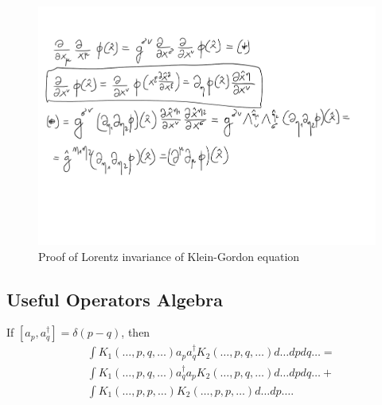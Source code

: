 \documentclass[main.tex]{subfiles}
\begin{document}
\begin{figure}
\label{klein-proof}
\includegraphics[scale=0.5]{figs/KleinInvariance}
\caption{Proof of Lorentz invariance of Klein-Gordon equation}
\end{figure}
\subsection{Useful Operators Algebra}
\begin{lemma}
If $[a_p, a^\dagger_q] = \delta(p - q)$, then
\begin{align*}
&\int K_1(\dots, p, q, \dots) a_p a^\dagger_q K_2(\dots, p, q, \dots) d \dots dpdq \ldots = \\
&\int K_1(\dots, p, q, \dots) a^\dagger_q a_p K_2(\dots, p, q, \dots) d \dots dpdq \ldots + \\ 
&\int K_1(\dots, p, p, \dots)K_2(\dots, p,p, \dots)d \dots dp \dots.
\end{align*}
\end{lemma}
\end{document}
